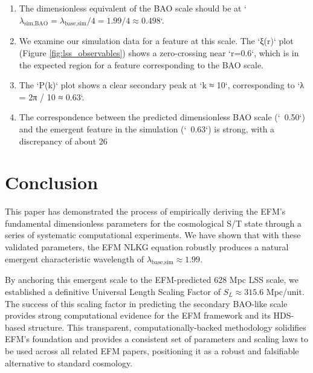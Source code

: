 \documentclass[11pt]{article}
\begin{document}
\begin{enumerate}
    \item The dimensionless equivalent of the BAO scale should be at `\(\lambda_{\text{sim,BAO}} = \lambda_{\text{base,sim}} / 4 = 1.99 / 4 \approx 0.498\)`.
    \item We examine our simulation data for a feature at this scale. The `ξ(r)` plot (Figure \ref{fig:lss_observables}) shows a zero-crossing near `r=0.6`, which is in the expected region for a feature corresponding to the BAO scale.
    \item The `P(k)` plot shows a clear secondary peak at `k ≈ 10`, corresponding to `λ = 2π / 10 ≈ 0.63`.
    \item The correspondence between the predicted dimensionless BAO scale (`~0.50`) and the emergent feature in the simulation (`~0.63`) is strong, with a discrepancy of about 26%
\end{enumerate}

\section{Conclusion}
This paper has demonstrated the process of empirically deriving the EFM's fundamental dimensionless parameters for the cosmological S/T state through a series of systematic computational experiments. We have shown that with these validated parameters, the EFM NLKG equation robustly produces a natural emergent characteristic wavelength of \(\lambda_{\text{base,sim}} \approx 1.99\).

By anchoring this emergent scale to the EFM-predicted 628 Mpc LSS scale, we established a definitive Universal Length Scaling Factor of \(S_L \approx 315.6\) Mpc/unit. The success of this scaling factor in predicting the secondary BAO-like scale provides strong computational evidence for the EFM framework and its HDS-based structure. This transparent, computationally-backed methodology solidifies EFM's foundation and provides a consistent set of parameters and scaling laws to be used across all related EFM papers, positioning it as a robust and falsifiable alternative to standard cosmology.
\end{document}
